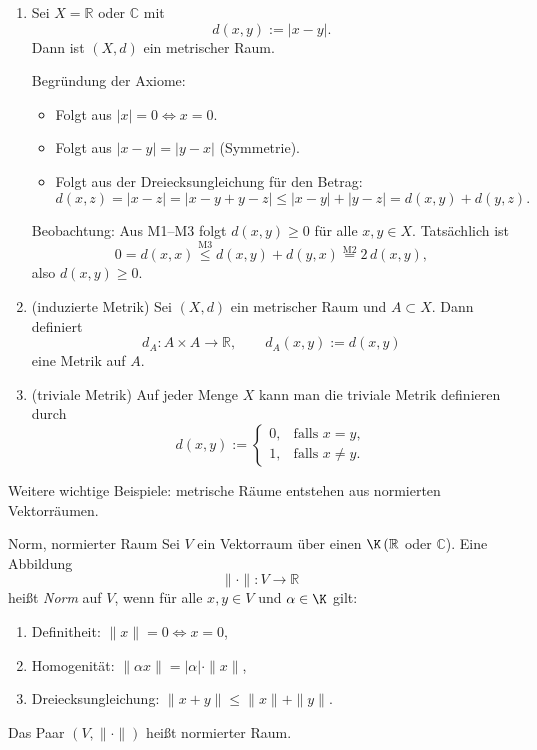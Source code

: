 \begin{beispielbox}
    \begin{enumerate}
        \item Sei $X=\mathbb{R}$ oder $\mathbb{C}$ mit
        $$
        d(x,y):=|x-y|.
        $$
        Dann ist $(X,d)$ ein metrischer Raum.

        \medskip

        Begründung der Axiome:
        \begin{itemize}
        \item[M1] Folgt aus $|x|=0 \Leftrightarrow x=0$.
        \item[M2] Folgt aus $|x-y|=|y-x|$ (Symmetrie).
        \item[M3] Folgt aus der Dreiecksungleichung für den Betrag:
        $$
        d(x,z)=|x-z|=|x-y+y-z|\le |x-y|+|y-z|=d(x,y)+d(y,z).
        $$
        \end{itemize}

        Beobachtung:
        Aus M1--M3 folgt $d(x,y)\ge 0$ für alle $x,y\in X$. Tatsächlich ist
        $$
        0=d(x,x)\stackrel{\text{M3}}{\le} d(x,y)+d(y,x)\stackrel{\text{M2}}{=}2\,d(x,y),
        $$
        also $d(x,y)\ge0$.

        \item (induzierte Metrik) Sei $(X,d)$ ein metrischer Raum und $A\subset X$. Dann definiert
        $$
        d_A : A\times A\to\mathbb{R},\qquad d_A(x,y):=d(x,y)
        $$
        eine Metrik auf $A$.

        \item (triviale Metrik) Auf jeder Menge $X$ kann man die triviale Metrik definieren durch
        $$
        d(x,y):=\begin{cases}
        0, &\text{falls }x=y,\\[4pt]
        1, &\text{falls }x\ne y.
        \end{cases}
        $$
    \end{enumerate}

    \medskip

    Weitere wichtige Beispiele: metrische Räume entstehen aus normierten Vektorräumen.
\end{beispielbox}

\begin{definition}[deflabel=NormRaum]{Norm, normierter Raum}
    Sei $V$ ein Vektorraum über einen $\K \, (\mathbb{R}$ oder $\mathbb{C}$). Eine Abbildung 
    $$
    \|\cdot\| : V \to \mathbb{R}$$
    heißt \emph{Norm} auf $V$, wenn für alle $x,y \in V$ und $\alpha \in \K$ gilt:

    \begin{enumerate}
        \item[(N1)] Definitheit: $\|x\| = 0 \Leftrightarrow x=0$,
        \item[(N2)] Homogenität: $\|\alpha x\| = |\alpha|\cdot\|x\|$,
        \item[(N3)] Dreiecksungleichung: $\|x+y\| \le \|x\| + \|y\|$.
    \end{enumerate}

    Das Paar $(V,\|\cdot\|)$ heißt normierter Raum.
\end{definition}


